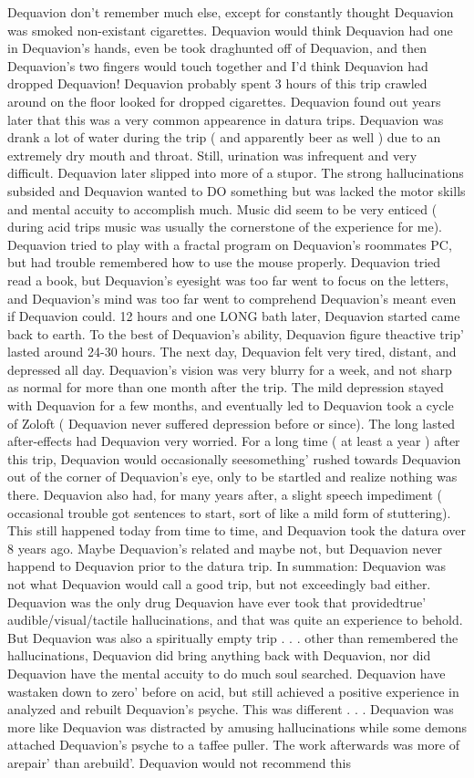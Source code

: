 \documentclass[12pt]{book}
\begin{document}
Dequavion don't remember much else, except for constantly thought Dequavion was smoked non-existant cigarettes. Dequavion would think Dequavion had one in Dequavion's hands, even be took draghunted off of Dequavion, and then Dequavion's two fingers would touch together and I'd think Dequavion had dropped Dequavion! Dequavion probably spent 3 hours of this trip crawled around on the floor looked for dropped cigarettes. Dequavion found out years later that this was a very common appearence in datura trips. Dequavion was drank a lot of water during the trip ( and apparently beer as well ) due to an extremely dry mouth and throat. Still, urination was infrequent and very difficult. Dequavion later slipped into more of a stupor. The strong hallucinations subsided and Dequavion wanted to DO something but was lacked the motor skills and mental accuity to accomplish much. Music did seem to be very enticed ( during acid trips music was usually the cornerstone of the experience for me). Dequavion tried to play with a fractal program on Dequavion's roommates PC, but had trouble remembered how to use the mouse properly. Dequavion tried read a book, but Dequavion's eyesight was too far went to focus on the letters, and Dequavion's mind was too far went to comprehend Dequavion's meant even if Dequavion could. 12 hours and one LONG bath later, Dequavion started came back to earth. To the best of Dequavion's ability, Dequavion figure theactive trip' lasted around 24-30 hours. The next day, Dequavion felt very tired, distant, and depressed all day. Dequavion's vision was very blurry for a week, and not sharp as normal for more than one month after the trip. The mild depression stayed with Dequavion for a few months, and eventually led to Dequavion took a cycle of Zoloft ( Dequavion never suffered depression before or since). The long lasted after-effects had Dequavion very worried. For a long time ( at least a year ) after this trip, Dequavion would occasionally seesomething' rushed towards Dequavion out of the corner of Dequavion's eye, only to be startled and realize nothing was there. Dequavion also had, for many years after, a slight speech impediment ( occasional trouble got sentences to start, sort of like a mild form of stuttering). This still happened today from time to time, and Dequavion took the datura over 8 years ago. Maybe Dequavion's related and maybe not, but Dequavion never happend to Dequavion prior to the datura trip. In summation: Dequavion was not what Dequavion would call a good trip, but not exceedingly bad either. Dequavion was the only drug Dequavion have ever took that providedtrue' audible/visual/tactile hallucinations, and that was quite an experience to behold. But Dequavion was also a spiritually empty trip . . .  other than remembered the hallucinations, Dequavion did bring anything back with Dequavion, nor did Dequavion have the mental accuity to do much soul searched. Dequavion have wastaken down to zero' before on acid, but still achieved a positive experience in analyzed and rebuilt Dequavion's psyche. This was different . . .  Dequavion was more like Dequavion was distracted by amusing hallucinations while some demons attached Dequavion's psyche to a taffee puller. The work afterwards was more of arepair' than arebuild'. Dequavion would not recommend this 
\end{document}
